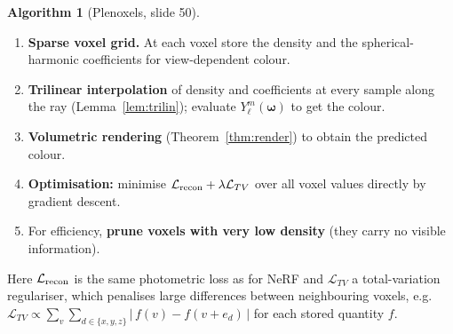\documentclass[11pt,a4paper]{article}
\newcommand{\om}{\boldsymbol{\omega}}
\theoremstyle{definition}
\newtheorem{algorithm}{Algorithm}[section]
\theoremstyle{plain}
\theoremstyle{remark}
\begin{document}
\begin{algorithm}[Plenoxels, slide 50]\label{alg:plenox}
\begin{enumerate}[nosep]
\item \textbf{Sparse voxel grid.} At each voxel store the density and the spherical-harmonic coefficients for view-dependent colour.
\item \textbf{Trilinear interpolation} of density and coefficients at every sample along the ray (Lemma~\ref{lem:trilin}); evaluate $Y_\ell^m(\om)$ to get the colour.
\item \textbf{Volumetric rendering} (Theorem~\ref{thm:render}) to obtain the predicted colour.
\item \textbf{Optimisation:} minimise $\mathcal L_{\rm recon}+\lambda\mathcal L_{TV}$ over all voxel values directly by gradient descent.
\item For efficiency, \textbf{prune voxels with very low density} (they carry no visible information).
\end{enumerate}
\end{algorithm}

Here $\mathcal L_{\rm recon}$ is the same photometric loss as for NeRF and $\mathcal L_{TV}$ a total-variation regulariser, which penalises large differences between neighbouring voxels, e.g.\ $\mathcal L_{TV}\propto\sum_{v}\sum_{d\in\{x,y,z\}}|\,f(v)-f(v+e_d)\,|$ for each stored quantity $f$.
\end{document}
